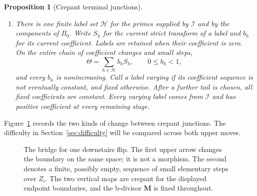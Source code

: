 \documentclass[11pt]{amsart}
\newtheorem{proposition}[theorem]{Proposition}
\theoremstyle{definition}
\theoremstyle{remark}
\numberwithin{equation}{section}
\newcommand{\M}{\mathbf{M}}
\begin{document}
\begin{proposition}[Crepant terminal junctions]
\begin{enumerate}
Starting with $(Y_i,\Theta_i'+\M)$, a finite, possibly empty, sequence
of small elementary steps over $Z_i$ ends at
$(Y_{i+1},\Theta_{i+1}+\M)$.  All its models are strong normal irreducible
compact K\"ahler fourfolds, all its pairs are generalized
terminal, and its boundary and nef data are transported as in an elementary
program.  In particular, every global place is exceptional over one model
of this connecting sequence if and only if it is exceptional over all of
them.
\item There is one finite label set $\mathcal H$ for the primes supplied by
$\mathcal I$ and by the components of $B_0$.  Write $S_h$ for the current
strict transform of a label and $b_h$ for its current coefficient.  Labels
are retained when their coefficient is zero.  On the entire chain of
coefficient changes and small steps,
\[
                    \Theta=\sum_{h\in\mathcal H}b_hS_h,
                    \qquad 0\leq b_h<1,
\]
and every $b_h$ is nonincreasing.  Call a label \emph{varying} if its
coefficient sequence is not eventually constant, and \emph{fixed}
otherwise.  After a further tail is chosen, all fixed coefficients are
constant.  Every varying label comes from $\mathcal I$ and has positive
coefficient at every remaining stage.
\end{enumerate}
\end{proposition}

Figure~\ref{fig:terminal-bridge} records the two kinds of change between
crepant junctions.  The difficulty in Section~\ref{sec:difficulty} will
be compared across both upper moves.
\begin{figure}[ht]
\centering
{}
\caption{The bridge for one downstairs flip.  The first upper arrow changes
the boundary on the same space; it is not a morphism.  The second denotes a
finite, possibly empty, sequence of small elementary steps over $Z_i$.
The two vertical maps are crepant for the displayed endpoint boundaries,
and the b-divisor $\M$ is fixed throughout.}
\label{fig:terminal-bridge}
\end{figure}
\end{document}
